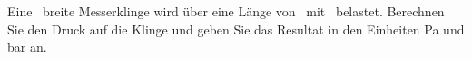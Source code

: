 Eine \bklO\ breite Messerklinge wird über eine Länge von \lklO\ mit \FklO\ belastet. Berechnen Sie den Druck auf die Klinge und geben Sie das Resultat in den Einheiten Pa und bar an.
